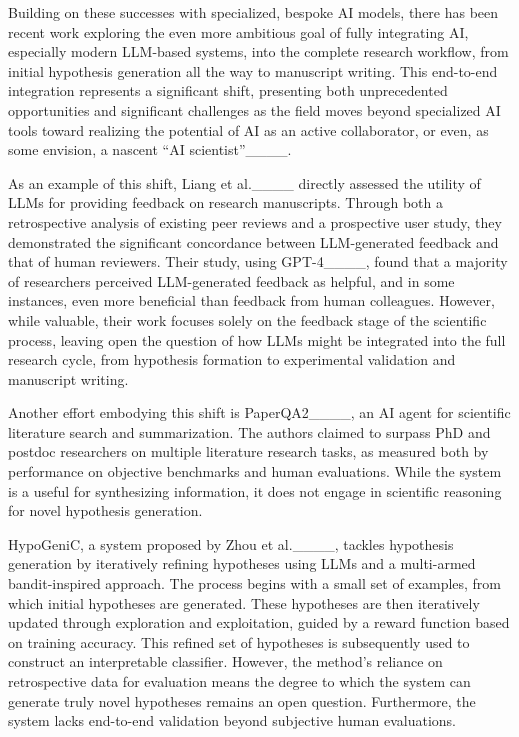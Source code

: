 Building on these successes with specialized, bespoke AI models, there has been recent work exploring the even more ambitious goal of fully integrating AI, especially modern LLM-based systems, into the complete research workflow, from initial hypothesis generation all the way to manuscript writing. This end-to-end integration represents a significant shift, presenting both unprecedented opportunities and significant challenges as the field moves beyond specialized AI tools toward realizing the potential of AI as an active collaborator, or even, as some envision, a nascent ``AI scientist''____.

As an example of this shift, Liang et al.____ directly assessed the utility of LLMs for providing feedback on research manuscripts. Through both a retrospective analysis of existing peer reviews and a prospective user study, they demonstrated the significant concordance between LLM-generated feedback and that of human reviewers. Their study, using GPT-4____, found that a majority of researchers perceived LLM-generated feedback as helpful, and in some instances, even more beneficial than feedback from human colleagues. However, while valuable, their work focuses solely on the feedback stage of the scientific process, leaving open the question of how LLMs might be integrated into the full research cycle, from hypothesis formation to experimental validation and manuscript writing.

Another effort embodying this shift is PaperQA2____, an AI agent for scientific literature search and summarization. The authors claimed to surpass PhD and postdoc researchers on multiple literature research tasks, as measured both by performance on objective benchmarks and human evaluations. While the system is a useful for synthesizing information, it does not engage in scientific reasoning for novel hypothesis generation.

HypoGeniC, a system proposed by Zhou et al.____, tackles hypothesis generation by iteratively refining hypotheses using LLMs and a multi-armed bandit-inspired approach. The process begins with a small set of examples, from which initial hypotheses are generated. These hypotheses are then iteratively updated through exploration and exploitation, guided by a reward function based on training accuracy.  This refined set of hypotheses is subsequently used to construct an interpretable classifier. However, the method's reliance on retrospective data for evaluation means the degree to which the system can generate truly novel hypotheses remains an open question. Furthermore, the system lacks end-to-end validation beyond subjective human evaluations.

